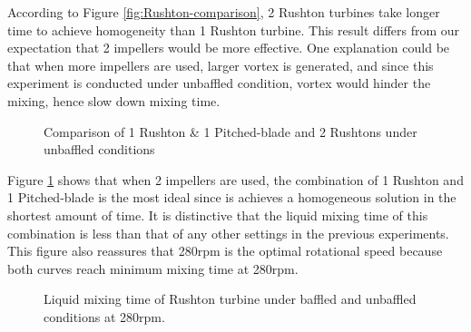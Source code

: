 According to Figure \ref{fig:Rushton-comparison}, 2 Rushton turbines take longer time to achieve homogeneity than 1 Rushton turbine. This result differs from our expectation that 2 impellers would be more effective. One explanation could be that when more impellers are used, larger vortex is generated, and since this experiment is conducted under unbaffled condition, vortex would hinder the mixing, hence slow down mixing time.

\begin{figure}[h] %
	\centering
	\caption{Comparison of 1 Rushton \& 1 Pitched-blade and 2 Rushtons under unbaffled conditions}
	\label{fig:PitchedAndRushton_2Rushton}
\end{figure}
Figure \ref{fig:PitchedAndRushton_2Rushton} shows that when 2 impellers are used, the combination of 1 Rushton and 1 Pitched-blade is the most ideal since is achieves a homogeneous solution in the shortest amount of time. It is distinctive that the liquid mixing time of this combination is less than that of any other settings in the previous experiments. This figure also reassures that 280rpm is the optimal rotational speed because both curves reach minimum mixing time at 280rpm.

\begin{figure}[h] %
	\centering
	\caption{Liquid mixing time of Rushton turbine under baffled and unbaffled conditions at 280rpm. }
	\label{fig:BaffledVsUnbaffled}
\end{figure}

